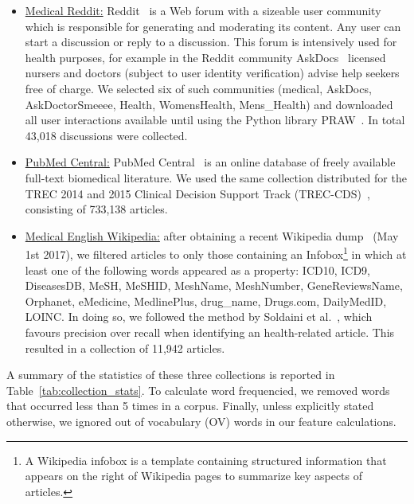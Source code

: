 \begin{itemize}
\item \underline{Medical Reddit:} Reddit~\cite{reddit} is a Web forum with a sizeable user community which is responsible for generating and moderating its content. Any user can start a discussion or reply to a discussion. This forum is intensively used for health purposes, for example in the Reddit community AskDocs~\cite{redditaskdocs} licensed nursers and doctors (subject to user identity verification) advise help seekers free of charge. We selected six of such communities
    (medical, AskDocs, AskDoctorSmeeee, Health, WomensHealth, Mens\_Health) and downloaded all user interactions available until  using the Python library PRAW~\cite{redditapi}. In total 43,018 discussions were collected.



\item \underline{PubMed Central:} PubMed Central~\cite{pubmed} is an online  database of freely available full-text biomedical literature. We used the same collection distributed for the TREC 2014 and 2015 Clinical Decision Support Track (TREC-CDS)~\cite{roberts16,trec15}, consisting of 733,138 articles. 
 
\item \underline{Medical English Wikipedia:} after obtaining a recent  Wikipedia dump~\cite{wikipedia} (May 1st 2017), we filtered articles to only those  containing an Infobox\footnote{A Wikipedia infobox is a template containing structured information that appears on the right of Wikipedia pages to summarize key aspects of articles.} in which at least one of the following words appeared as a property: ICD10, ICD9, DiseasesDB, MeSH, MeSHID, MeshName, MeshNumber, GeneReviewsName, Orphanet, eMedicine, MedlinePlus, drug\_name, Drugs.com, DailyMedID, LOINC.
In doing so, we followed the method by Soldaini et al.~\cite{soldaini15}, which favours precision over recall when identifying an health-related article. This resulted in a collection of 11,942 articles. 
\end{itemize}

A summary of the statistics of these three collections is reported in Table~\ref{tab:collection_stats}. To calculate word frequencied, we removed words that occurred less than 5 times in a corpus. Finally, unless explicitly stated otherwise, we ignored out of vocabulary (OV) words in our feature calculations.



